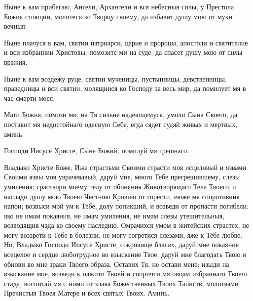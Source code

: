 \begin{mymulticols}



Ныне к вам прибегаю, Ангели, Архангели и вся небесныя силы, у Престола Божия стоящии, молитеся ко Творцу своему, да избавит душу мою от муки вечныя.


Ныне плачуся к вам, святии патриарси, царие и пророцы, апостоли и святителие и вси избраннии Христовы: помозите ми на суде, да спасет душу мою от силы вражия.

\slava

Ныне к вам воздежу руце, святии мученицы, пустынницы, девственницы, праведницы и вси святии, молящиися ко Господу за весь мир, да помилует мя в час смерти моея.

\inyne

Мати Божия, помози ми, на Тя сильне надеющемуся, умоли Сына Своего, да поставит мя недостойнаго одесную Себе, егда сядет судяй живых и мертвых, аминь.


Господи Иисусе Христе, Сыне Божий, помилуй мя грешнаго.

Владыко Христе Боже, Иже страстьми Своими страсти моя исцеливый и язвами Своими язвы моя уврачевавый, даруй мне, много Тебе прегрешившему, слезы умиления; сраствори моему телу от обоняния Животворящаго Тела Твоего, и наслади душу мою Твоею Честною Кровию от горести, еюже мя сопротивник напои; возвыси мой ум к Тебе, долу поникший, и возведи от пропасти погибели: яко не имам покаяния, не имам умиления, не имам слезы утешительныя, возводящия чада ко своему наследию. Омрачихся умом в житейских страстех, не могу воззрети к Тебе в болезни, не могу согретися слезами, яже к Тебе любве. Но, Владыко Господи Иисусе Христе, сокровище благих, даруй мне покаяние всецелое и сердце люботрудное во взыскание Твое, даруй мне благодать Твою и обнови во мне зраки Твоего образа. Оставих Тя, не остави мене; изыди на взыскание мое, возведи к пажити Твоей и сопричти мя овцам избраннаго Твоего стада, воспитай мя с ними от злака Божественных Твоих Таинств, молитвами Пречистыя Твоея Матере и всех святых Твоих. Аминь.

\end{mymulticols}

